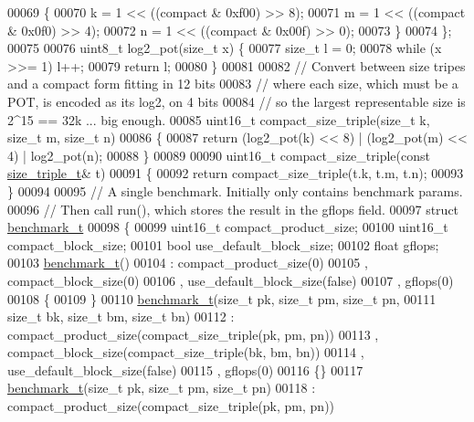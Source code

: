 \begin{DoxyCode}
00069   \{
00070     k = 1 << ((compact & 0xf00) >> 8);
00071     m = 1 << ((compact & 0x0f0) >> 4);
00072     n = 1 << ((compact & 0x00f) >> 0);
00073   \}
00074 \};
00075 
00076 uint8\_t log2\_pot(\textcolor{keywordtype}{size\_t} x) \{
00077   \textcolor{keywordtype}{size\_t} l = 0;
00078   \textcolor{keywordflow}{while} (x >>= 1) l++;
00079   \textcolor{keywordflow}{return} l;
00080 \}
00081 
00082 \textcolor{comment}{// Convert between size tripes and a compact form fitting in 12 bits}
00083 \textcolor{comment}{// where each size, which must be a POT, is encoded as its log2, on 4 bits}
00084 \textcolor{comment}{// so the largest representable size is 2^15 == 32k  ... big enough.}
00085 uint16\_t compact\_size\_triple(\textcolor{keywordtype}{size\_t} k, \textcolor{keywordtype}{size\_t} m, \textcolor{keywordtype}{size\_t} n)
00086 \{
00087   \textcolor{keywordflow}{return} (log2\_pot(k) << 8) | (log2\_pot(m) << 4) | log2\_pot(n);
00088 \}
00089 
00090 uint16\_t compact\_size\_triple(\textcolor{keyword}{const} \hyperlink{structsize__triple__t}{size\_triple\_t}& t)
00091 \{
00092   \textcolor{keywordflow}{return} compact\_size\_triple(t.k, t.m, t.n);
00093 \}
00094 
00095 \textcolor{comment}{// A single benchmark. Initially only contains benchmark params.}
00096 \textcolor{comment}{// Then call run(), which stores the result in the gflops field.}
00097 \textcolor{keyword}{struct }\hyperlink{structbenchmark__t}{benchmark\_t}
00098 \{
00099   uint16\_t compact\_product\_size;
00100   uint16\_t compact\_block\_size;
00101   \textcolor{keywordtype}{bool} use\_default\_block\_size;
00102   \textcolor{keywordtype}{float} gflops;
00103   \hyperlink{structbenchmark__t}{benchmark\_t}()
00104     : compact\_product\_size(0)
00105     , compact\_block\_size(0)
00106     , use\_default\_block\_size(false)
00107     , gflops(0)
00108   \{
00109   \}
00110   \hyperlink{structbenchmark__t}{benchmark\_t}(\textcolor{keywordtype}{size\_t} pk, \textcolor{keywordtype}{size\_t} pm, \textcolor{keywordtype}{size\_t} pn,
00111               \textcolor{keywordtype}{size\_t} bk, \textcolor{keywordtype}{size\_t} bm, \textcolor{keywordtype}{size\_t} bn)
00112     : compact\_product\_size(compact\_size\_triple(pk, pm, pn))
00113     , compact\_block\_size(compact\_size\_triple(bk, bm, bn))
00114     , use\_default\_block\_size(false)
00115     , gflops(0)
00116   \{\}
00117   \hyperlink{structbenchmark__t}{benchmark\_t}(\textcolor{keywordtype}{size\_t} pk, \textcolor{keywordtype}{size\_t} pm, \textcolor{keywordtype}{size\_t} pn)
00118     : compact\_product\_size(compact\_size\_triple(pk, pm, pn))

\end{DoxyCode}
